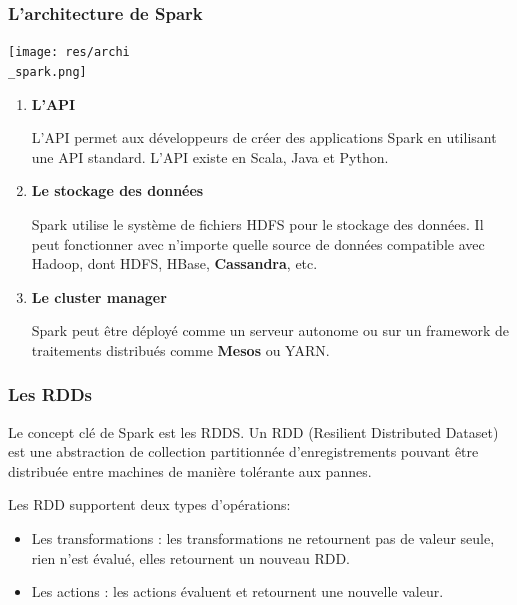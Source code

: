 \documentclass[a4paper, 11pt, titlepage]{article}
\begin{document}
\subsubsection* {L'architecture de Spark}

\begin{center}
\texttt{[image: res/archi\\\_spark.png]}
\end{center}


\begin{enumerate}

\item
\textbf{L'API}

L'API permet aux développeurs de créer des applications Spark en utilisant une API standard. L'API existe en Scala, Java et Python.

\item
\textbf{Le stockage des données}

Spark utilise le système de fichiers HDFS pour le stockage des données. Il peut fonctionner avec n'importe quelle source de données compatible avec Hadoop, dont HDFS, HBase, \textbf{Cassandra}, etc.


\item
\textbf{Le cluster manager}

Spark peut être déployé comme un serveur autonome ou sur un framework de traitements distribués comme \textbf{Mesos} ou YARN.

\end{enumerate}


\subsubsection* {Les RDDs}


Le concept clé de Spark est les RDDS. Un RDD (Resilient Distributed Dataset) est une abstraction de collection partitionnée d'enregistrements pouvant être distribuée entre machines de manière tolérante aux pannes.


Les RDD supportent deux types d'opérations:

\begin{itemize}

\item
Les transformations : les transformations ne retournent pas de valeur seule, rien n'est évalué, elles retournent un nouveau RDD.

\item
Les actions : les actions évaluent et retournent une nouvelle valeur.

\end{itemize}
\end{document}
